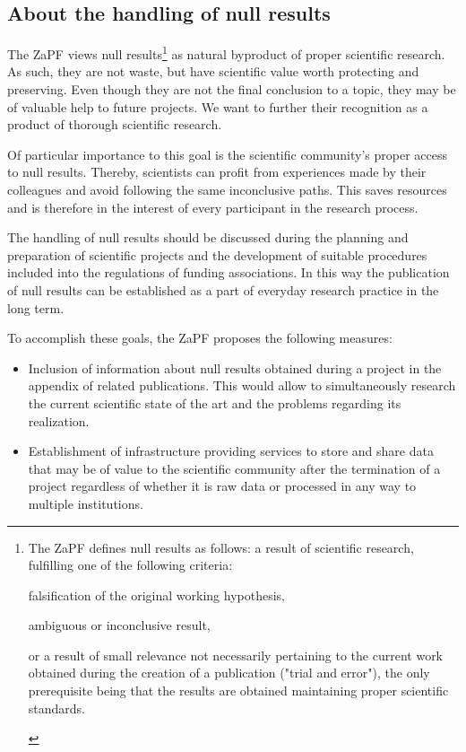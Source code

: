 
\subsection{About the handling of null results}
The ZaPF views null results\footnote{The ZaPF defines null results as follows: a result of scientific research, fulfilling one of the following criteria:
\begin{compactitem}
  \item falsification of the original working hypothesis,
  \item ambiguous or inconclusive result,
  \item or a result of small relevance not necessarily pertaining to the current work obtained during the creation of a publication ("trial and error"),
    the only prerequisite being that the results are obtained maintaining proper scientific standards.
\end{compactitem}
} as natural byproduct of proper scientific research. As such, they are not waste, but have scientific value worth protecting and preserving. Even though they are not the final conclusion to a topic, they may be of valuable help to future projects. We want to further their recognition as a product of thorough scientific research.

Of particular importance to this goal is the scientific community's proper access to null results. Thereby, scientists can profit from experiences made by their colleagues and avoid following the same inconclusive paths. This saves resources and is therefore in the interest of every participant in the research process.

The handling of null results should be discussed during the planning and preparation of scientific projects and the development of suitable procedures included into the regulations of funding associations. In this way the publication of null results can be established as a part of everyday research practice in the long term.

To accomplish these goals, the ZaPF proposes the following measures:
\begin{itemize}
  \item Inclusion of information about null results obtained during a project in the appendix of related publications. This would allow to simultaneously research the current scientific state of the art and the problems regarding its realization.
  \item Establishment of infrastructure providing services to store and share data that may be of value to the scientific community after the termination of a project regardless of whether it is raw data or processed in any way to multiple institutions.
\end{itemize}